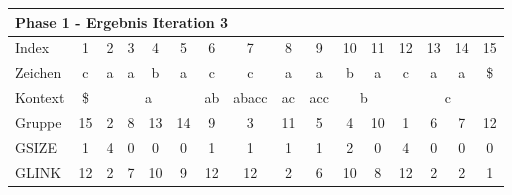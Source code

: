\begin{table}[H]
\centering
\begin{adjustbox}{max width=\textwidth}
\begin{tabular}{lccccccccccccccc}
\multicolumn{16}{l}{Phase 1 - Ergebnis Iteration 3}                                                                                                                                                                                                                                                                                                     \\ \hline
\multicolumn{1}{l|}{Index}   & 1                       & 2   & 3                         & 4  & 5                         & 6                                               & 7                                                  & 8                       & \cellcolor[HTML]{\green}9 & 10 & 11                      & 12  & 13  & 14  & 15  \\
\multicolumn{1}{l|}{Zeichen} & c                       & a   & a                         & b  & a                         & c                                               & c                                                  & a                       & a                         & b  & a                       & c   & a   & a   & \$  \\ \cline{1-16}
\multicolumn{1}{l|}{Kontext} & \multicolumn{1}{c|}{\$} & \multicolumn{4}{c|}{a}                                           & \multicolumn{1}{c|}{\cellcolor[HTML]{\red}ab} & \multicolumn{1}{c|}{\cellcolor[HTML]{\red}abacc} & \multicolumn{1}{c|}{ac} & \multicolumn{1}{c|}{acc}  & \multicolumn{2}{c|}{b}       & \multicolumn{4}{c}{c} \\
\multicolumn{1}{l|}{Gruppe}      & \multicolumn{1}{c|}{15} & 2   & 8                         & 13 & \multicolumn{1}{c|}{14}   & \multicolumn{1}{c|}{\cellcolor[HTML]{\red}9}  & \multicolumn{1}{c|}{\cellcolor[HTML]{\red}3}     & \multicolumn{1}{c|}{11} & \multicolumn{1}{c|}{5}    & 4  & \multicolumn{1}{c|}{10} & 1   & 6   & 7   & 12  \\
\multicolumn{1}{l|}{GSIZE}   & \multicolumn{1}{c|}{1}  & 4   & 0                         & 0  & \multicolumn{1}{c|}{0}    & \multicolumn{1}{c|}{\cellcolor[HTML]{\red}1}  & \multicolumn{1}{c|}{\cellcolor[HTML]{\red}1}     & \multicolumn{1}{c|}{1}  & \multicolumn{1}{c|}{1}    & 2  & \multicolumn{1}{c|}{0}  & 4   & 0   & 0   & 0   \\
\multicolumn{1}{l|}{GLINK}   & 12                      & 2   & \cellcolor[HTML]{\red}7 & 10 & 9                         & 12                                              & 12                                                 & 2                       & 6                         & 10 & 8                       & 12  & 2   & 2   & 1   \\

\end{tabular}
\end{adjustbox}
\end{table}
